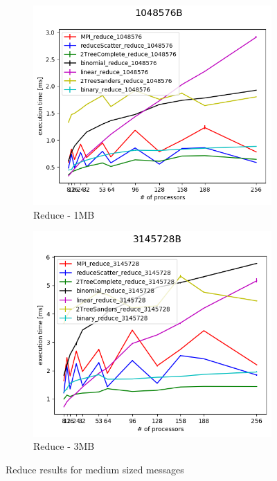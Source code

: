 \documentclass[sigplan,review,anonymous]{acmart}\settopmatter{printfolios=true,printccs=false,printacmref=false}
\begin{document}
\begin{figure}
\centering
\begin{subfigure}{.25\textwidth}
  \centering
  \includegraphics[width=1\linewidth]{images/Results/Reduce_all_1048576B.png}
  \caption{Reduce - 1MB}
  \label{reduce-selected-1MB}
\end{subfigure}%
\begin{subfigure}{.25\textwidth}
  \centering
  \includegraphics[width=1\linewidth]{images/Results/Reduce_all_3145728B.png}
  \caption{Reduce - 3MB}
  \label{reduce-selected-3MB}
\end{subfigure}
\caption{Reduce results for medium sized messages}
\label{graph-reduce-medium1-selected}
\end{figure}
\end{document}
